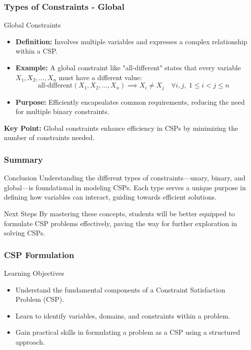 \documentclass[aspectratio=169]{beamer}
\begin{document}
\begin{frame}[fragile]
    \frametitle{Types of Constraints - Global}
    \begin{block}{Global Constraints}
        \begin{itemize}
            \item \textbf{Definition:} Involves multiple variables and expresses a complex relationship within a CSP.
            \item \textbf{Example:} A global constraint like "all-different" states that every variable \( X_1, X_2, \ldots, X_n \) must have a different value:
            \[
            \text{all-different}(X_1, X_2, \ldots, X_n) \implies X_i \neq X_j \quad \forall i,j, \; 1 \leq i < j \leq n
            \]
            \item \textbf{Purpose:} Efficiently encapsulates common requirements, reducing the need for multiple binary constraints.
        \end{itemize}
        \textbf{Key Point:} Global constraints enhance efficiency in CSPs by minimizing the number of constraints needed.
    \end{block}
\end{frame}

\begin{frame}[fragile]
    \frametitle{Summary}
    \begin{block}{Conclusion}
        Understanding the different types of constraints—unary, binary, and global—is foundational in modeling CSPs. Each type serves a unique purpose in defining how variables can interact, guiding towards efficient solutions.
    \end{block}
    \begin{block}{Next Steps}
        By mastering these concepts, students will be better equipped to formulate CSP problems effectively, paving the way for further exploration in solving CSPs.
    \end{block}
\end{frame}

\begin{frame}[fragile]
    \frametitle{CSP Formulation}
    \begin{block}{Learning Objectives}
        \begin{itemize}
            \item Understand the fundamental components of a Constraint Satisfaction Problem (CSP).
            \item Learn to identify variables, domains, and constraints within a problem.
            \item Gain practical skills in formulating a problem as a CSP using a structured approach.
        \end{itemize}
    \end{block}
\end{frame}
\end{document}
